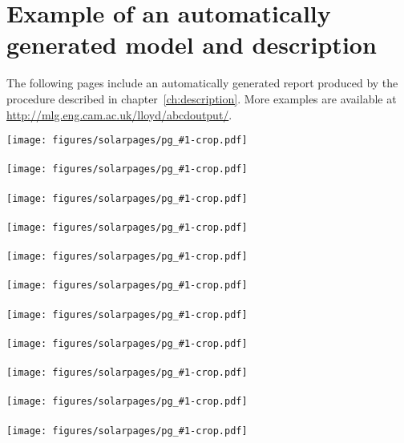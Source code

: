 
\inbpdocument

\chapter{Example of an automatically generated model and description}
\label{ch:example-solar}

The following pages include an automatically generated report produced by the procedure described in chapter~\ref{ch:description}.
More examples are available at \url{http://mlg.eng.cam.ac.uk/lloyd/abcdoutput/}.

\newpage

\newcommand{\solarreportpage}[1]{\texttt{[image: figures/solarpages/pg\_\#1-crop.pdf]}}

\solarreportpage{0002}
\\ \vspace{1cm} \\
\solarreportpage{0003}
\\ \vspace{1cm} \\
\solarreportpage{0004}
\\ \vspace{1cm} \\
\solarreportpage{0005}
\\ \vspace{1cm} \\
\solarreportpage{0006}
\\ \vspace{1cm} \\
\solarreportpage{0007}
\\ \vspace{1cm} \\
\solarreportpage{0008}
\\ \vspace{1cm} \\
\solarreportpage{0009}
\\ \vspace{1cm} \\
\solarreportpage{0010}
\\ \vspace{1cm} \\
\solarreportpage{0011}
\\ \vspace{1cm} \\
\solarreportpage{0012}
\\ \vspace{1cm} \\
